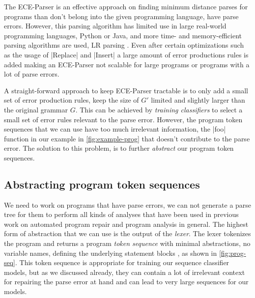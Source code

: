The ECE-Parser is an effective approach on finding minimum distance parses for
programs than don't belong into the given programming language, \ie have parse
errors. However, this parsing algorithm has limited use in large real-world
programming languages, \eg Python or Java, and more time- and memory-efficient
parsing algorithms are used, \eg LR parsing \etc \citep{Knuth_1965,
Chapman_1987}. Even after certain optimizations such as the usage of |Replace|
and |Insert| a large amount of error productions rules is added making an
ECE-Parser not scalable for large programs or programs with a lot of parse
errors.

A straight-forward approach to keep ECE-Parser tractable is to only add a small
set of error production rules, \ie keep the size of $G'$ limited and slightly
larger than the original grammar $G$. This can be achieved by \emph{training
classifiers} to select a small set of error rules relevant to the parse error.
However, the program token sequences that we can use have too much irrelevant
information, \eg the |foo| function in our example in \autoref{fig:example-prog}
that doesn't contribute to the parse error. The solution to this problem, is to
further \emph{abstract} our program token sequences.

\subsection{Abstracting program token sequences}
\label{sec:overview:abstraction}

We need to work on programs that have parse errors, \ie we can not generate a
parse tree for them to perform all kinds of analyses that have been used in
previous work on automated program repair \citep{Sakkas_2020,
Martinez_2013,Gulwani_2018, Wang_2018} and program analysis in general.
%
The highest form of abstraction that we can use is the output of the
\emph{lexer}. The lexer tokenizes the program and returns a program \emph{token
sequence} with minimal abstractions, \eg no variable names, defining the
underlying statement blocks \etc, as shown in \autoref{fig:prog-seq}. This token
sequence is appropriate for training our sequence classifier models, but as we
discussed already, they can contain a lot of irrelevant context for repairing
the parse error at hand and can lead to very large sequences for our models.

